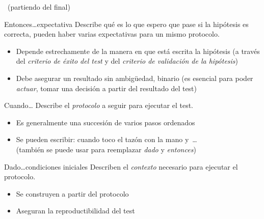   \begin{frame}[label=expectativa]{\insertsubsection~(partiendo del final)}

    \begin{block}{Entonces\dots \alert{expectativa}}
      Describe qué es lo que espero que pase si la hipótesis es correcta,
      pueden haber varias expectativas para un mismo protocolo.
    \end{block}
    \begin{block}{}
      \begin{itemize}
        \item Depende estrechamente de la manera en que está escrita la hipótesis (a través del \emph{criterio de éxito del test} y del \emph{criterio de validación de la hipótesis})
        \hyperlink{criterios}{}
        \item Debe asegurar un resultado sin ambigüedad, \alert{binario} (es esencial para poder \alert{\emph{actuar}}, tomar una decisión a partir del resultado del test)
      \end{itemize}
    \end{block}
  \end{frame}

  \begin{frame}{\insertsubsection}
    \begin{block}{Cuando\dots}
      Describe el \alert{\emph{protocolo}} a seguir para ejecutar el test.
    \end{block}
    \begin{block}{}
      \begin{itemize}
        \item Es generalmente una succesión de varios pasos ordenados
        \item Se pueden escribir: \alert{cuando} toco el tazón con la mano \alert{y}~\dots\\
        (también se puede usar para reemplazar \emph{dado} y \emph{entonces})
      \end{itemize}
    \end{block}
  \end{frame}

  \begin{frame}{\insertsubsection}
    \begin{block}{Dado\dots \alert{condiciones iniciales}}
      Describen el \emph{contexto} necesario para ejecutar el protocolo.
    \end{block}
    \begin{block}{}
      \begin{itemize}
        \item Se construyen a partir del protocolo
        \item Aseguran la \alert{reproductibilidad} del test
      \end{itemize}
    \end{block}
  \end{frame}

